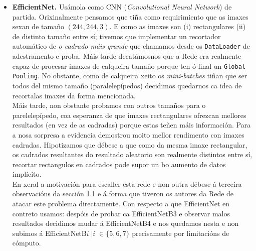 \documentclass{article}
\begin{document}
\begin{itemize}
	\item  \textbf{EfficientNet.} \cite{tan2019efficientnet} Usámola como CNN (\emph{Convolutional Neural Network}) de partida. Orixinalmente pensamos que tiña como requirimiento que as imaxes sexan de tamaño $(244,244,3)$. E como as imaxes son (i) rectangulares (ii) de distinto tamaño entre sí; tivemos que implementar un recortador automático de \emph{o cadrado máis grande} que chamamos desde os \texttt{DataLoader} de adestramento e proba. Máis tarde decatámosnos que a Rede era realmente capaz de procesar imaxes de calqueira tamaño porque ten ó final un \texttt{Global Pooling}. No obstante, como de calqueira xeito os \emph{mini-batches} tiñan que ser todos del mismo tamaño (paralelepípedos) decidimos quedarnos ca idea de recortalas imaxes da forma mencionada. \\

Máis tarde, non obstante probamos con outros tamaños para o parelelepípedo, coa esperanza de que imaxes rectangulares ofrezcan mellores resultados (en vez de as cadradas) porque estas teñen máis información. Para a nosa sorpresa a evidencia demostrou moito mellor rendimento con imaxes cadradas. Hipotizamos que débese a que como da mesma imaxe rectangular, os cadrados resultantes do resultado aleatorio son realmente distintos entre sí, recortar rectangulos en cadrados pode supor un bo aumento de datos implícito. \\

En xeral a motivación para escaller esta rede e non outra débese á terceira observacións da sección 1.1 e á forma que tiveron os autores da Rede de atacar este problema directamente. Con respecto a que EfficientNet en contreto usamos: despóis de probar ca EfficientNetB3 e observar malos resultados decidimos mudar á EfficientNetB4 e nos quedamos nesta e non subimos á EfficientNetB$i \; | i\; \in \{5,6,7\}$ precisamente por limitacións de cómputo.


\end{itemize}
\end{document}
